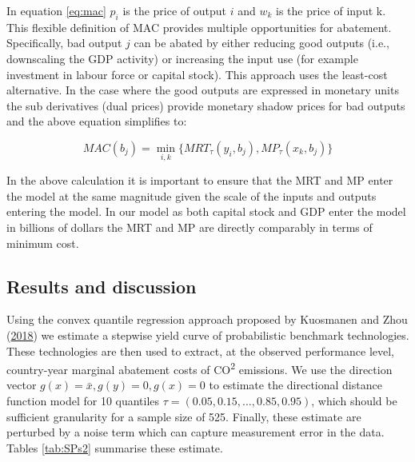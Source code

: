 \documentclass[
  12pt,
]{article}
\begin{document}
In equation \eqref{eq:mac} \(p_{i}\) is the price of output \(i\) and \(w_{k}\) is the price of input k. This flexible definition of MAC provides multiple opportunities for abatement. Specifically, bad output \(j\) can be abated by either reducing good outputs (i.e., downscaling the GDP activity) or increasing the input use (for example investment in labour force or capital stock). This approach uses the least-cost alternative. In the case where the good outputs are expressed in monetary units the sub derivatives (dual prices) provide monetary shadow prices for bad outputs and the above equation simplifies to:

\begin{equation}
MAC(b_{j})=\displaystyle \min_{i,k}\{MRT_{\tau}(y_{i},b_{j}), MP_{\tau}(x_{k},b_{j})\} 
\label{eq:mac1}
\end{equation}

In the above calculation it is important to ensure that the MRT and MP enter the model at the same magnitude given the scale of the inputs and outputs entering the model. In our model as both capital stock and GDP enter the model in billions of dollars the MRT and MP are directly comparably in terms of minimum cost.

\hypertarget{results-and-discussion}{%
\subsection{Results and discussion}\label{results-and-discussion}}

Using the convex quantile regression approach proposed by Kuosmanen and Zhou (\protect\hyperlink{ref-Kuosmanen2018b}{2018}) we estimate a stepwise yield curve of probabilistic benchmark technologies. These technologies are then used to extract, at the observed performance level, country-year marginal abatement costs of CO\textsuperscript{2} emissions. We use the direction vector \(g(x)=\bar{x}, g(y)=0, g(x)=0\) to estimate the directional distance function model for 10 quantiles \(\tau=(0.05,0.15,\dots,0.85,0.95)\), which should be sufficient granularity for a sample size of 525. Finally, these estimate are perturbed by a noise term which can capture measurement error in the data. Tables \ref{tab:SPs2} summarise these estimate.
\end{document}
